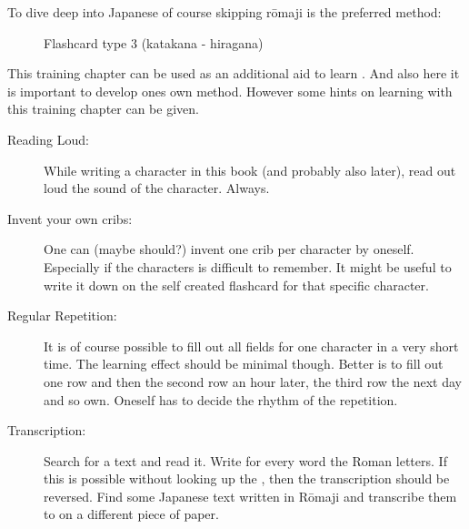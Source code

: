 \normalsize

To dive deep into Japanese of course skipping rōmaji is the preferred method:

\begin{figure}[H]
        
        \caption{Flashcard type 3 (katakana - hiragana)}
        \label{fig:FlashCardTypeThree}
\end{figure}

This training chapter can be used as an additional aid to learn
\textbf{\jtopic}. And also here it is important to develop ones own method.
However some hints on learning with this training chapter can be given.

\begin{description}

\item[Reading Loud:] While writing a \textbf{\jtopic} character in this book
        (and probably also later), read out loud the sound of the character.
        Always.

\item[Invent your own cribs:] One can (maybe should?) invent one crib per
        character by oneself. Especially if the characters is difficult to
        remember. It might be useful to write it down on the self created
        flashcard for that specific character.

\item[Regular Repetition:] It is of course possible to fill out all fields for
        one character in a very short time. The learning effect should be
        minimal though. Better is to fill out one row and then the second row
        an hour later, the third row the next day and so own. Oneself has to
        decide the rhythm of the repetition.

\item[Transcription:]  Search for a  \textbf{\jtopic} text and read it. Write
        for every \jtopic word the Roman letters. If this is possible without
        looking up the \jtopic, then the transcription should be reversed. Find
        some Japanese text written in Rōmaji and transcribe them to \jtopic on
        a different piece of paper.

\end{description}

\newpage


